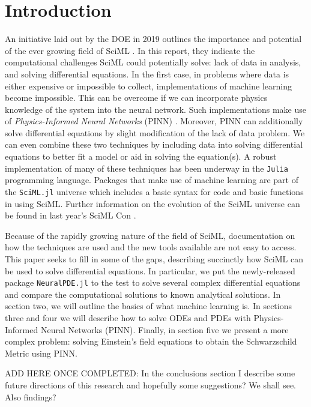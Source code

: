 \documentclass{CUP-JNL-DTM}%
\theoremstyle{definition}
\numberwithin{equation}{section}
\newcommand{\Julia}{\texttt{Julia} }
\begin{document}
\section{Introduction}

An initiative laid out by the DOE in 2019 outlines the importance and potential of the ever growing field of SciML \cite{bakerWorkshopReportBasic2019}. In this report, they indicate the computational challenges SciML could potentially solve: lack of data in analysis, and solving differential equations. In the first case, in problems where data is either expensive or impossible to collect, implementations of machine learning become impossible. This can be overcome if we can incorporate physics knowledge of the system into the neural network. Such implementations make use of \emph{Physics-Informed Neural Networks} (PINN) \cite{karniadakisPhysicsinformedMachineLearning2021}. Moreover, PINN can additionally solve differential equations by slight modification of the lack of data problem. We can even combine these two techniques by including data into solving differential equations to better fit a model or aid in solving the equation(s). A robust implementation of many of these techniques has been underway in the \Julia programming language. Packages that make use of machine learning are part of the \texttt{SciML.jl} universe which includes a basic syntax for code and basic functions in using SciML. Further information on the evolution of the SciML universe can be found in last year's SciML Con \cite{SciMLCon2022}. 

Because of the rapidly growing nature of the field of SciML, documentation on how the techniques are used and the new tools available are not easy to access. This paper seeks to fill in some of the gaps, describing succinctly how SciML can be used to solve differential equations. In particular, we put the newly-released package \texttt{NeuralPDE.jl} to the test to solve several complex differential equations and compare the computational solutions to known analytical solutions. In section two, we will outline the basics of what machine learning is. In sections three and four we will describe how to solve ODEs and PDEs with Physics-Informed Neural Networks (PINN). Finally, in section five we present a more complex problem: solving Einstein's field equations to obtain the Schwarzschild Metric using PINN. 

ADD HERE ONCE COMPLETED:
In the conclusions section I describe some future directions of this research and hopefully some suggestions? We shall see. Also findings?
\end{document}
